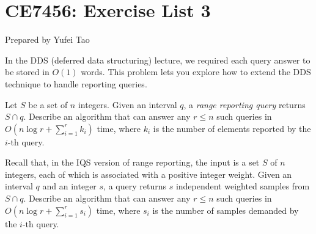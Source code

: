 


\usepackage{amsfonts, amsmath, amssymb, amsthm}
\usepackage{comment}
\usepackage{graphicx}
\usepackage{ifthen}
\usepackage{latexsym}
\usepackage[normalem]{ulem}



\def\dom{\prec}
\def\T{\mathcal{T}}




\section*{CE7456: Exercise List 3}
Prepared by Yufei Tao \\



 In the DDS (deferred data structuring) lecture, we required each query answer to be stored in $O(1)$ words. This problem lets you explore how to extend the DDS technique to handle reporting queries.

\vgap

Let $S$ be a set of $n$ integers. Given an interval $q$, a {\em range reporting query} returns $S \cap q$. Describe an algorithm that can answer any $r \le n$ such queries in $O(n \log r + \sum_{i=1}^r k_i)$ time, where $k_i$ is the number of elements reported by the $i$-th query.

 Recall that, in the IQS version of range reporting, the input is a set $S$ of $n$ integers, each of which is associated with a positive integer weight. Given an interval $q$ and an integer $s$, a query returns $s$ independent weighted samples from $S \cap q$. Describe an algorithm that can answer any $r \le n$ such queries in $O(n \log r + \sum_{i=1}^r s_i)$ time, where $s_i$ is the number of samples demanded by the $i$-th query.

